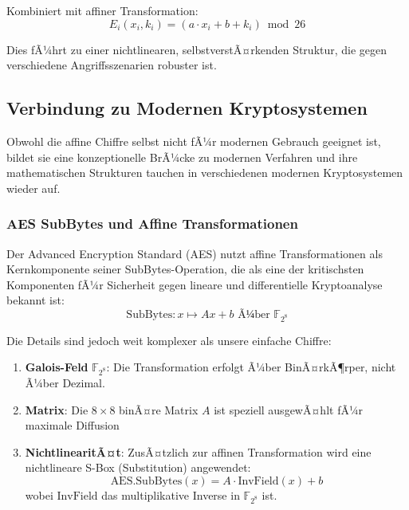 ﻿\documentclass[12pt,a4paper]{article}
\begin{document}
	Kombiniert mit affiner Transformation:
	\begin{equation}
		E_i(x_i, k_i) = (a \cdot x_i + b + k_i) \bmod 26
	\end{equation}
	
	Dies fÃ¼hrt zu einer nichtlinearen, selbstverstÃ¤rkenden Struktur, die gegen verschiedene Angriffsszenarien robuster ist.
	
	
	\subsection{Verbindung zu Modernen Kryptosystemen}
	
	Obwohl die affine Chiffre selbst nicht fÃ¼r modernen Gebrauch geeignet ist, bildet sie eine konzeptionelle BrÃ¼cke zu modernen Verfahren und ihre mathematischen Strukturen tauchen in verschiedenen modernen Kryptosystemen wieder auf.
	
	\subsubsection{AES SubBytes und Affine Transformationen}
	
	Der Advanced Encryption Standard (AES) nutzt affine Transformationen als Kernkomponente seiner SubBytes-Operation, die als eine der kritischsten Komponenten fÃ¼r Sicherheit gegen lineare und differentielle Kryptoanalyse bekannt ist:
	\begin{equation}
		\text{SubBytes}: x \mapsto Ax + b \text{ Ã¼ber } \mathbb{F}_{2^8}
	\end{equation}
	
	Die Details sind jedoch weit komplexer als unsere einfache Chiffre:
	\begin{enumerate}
		\item \textbf{Galois-Feld} $\mathbb{F}_{2^8}$: Die Transformation erfolgt Ã¼ber BinÃ¤rkÃ¶rper, nicht Ã¼ber Dezimal.
		\item \textbf{Matrix}: Die $8 \times 8$ binÃ¤re Matrix $A$ ist speziell ausgewÃ¤hlt fÃ¼r maximale Diffusion
		\item \textbf{NichtlinearitÃ¤t}: ZusÃ¤tzlich zur affinen Transformation wird eine nichtlineare S-Box (Substitution) angewendet:
		\begin{equation}
			\text{AES.SubBytes}(x) = A \cdot \text{InvField}(x) + b
		\end{equation}
		wobei $\text{InvField}$ das multiplikative Inverse in $\mathbb{F}_{2^8}$ ist.
	\end{enumerate}
	
\end{document}
